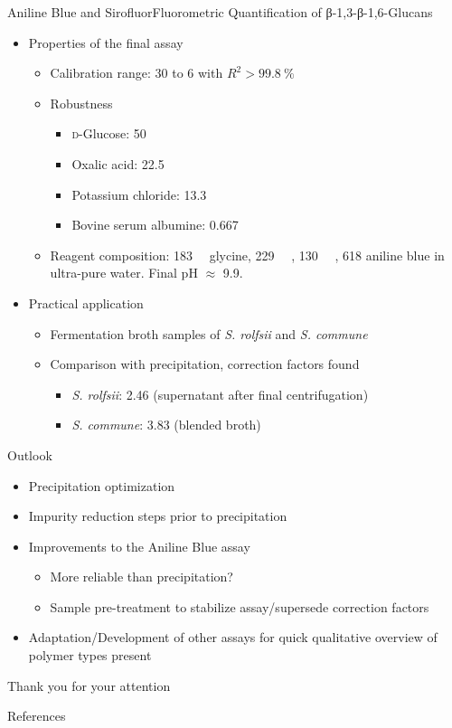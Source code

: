 \documentclass[mathserif]{beamer}
\newcommand{\SIpct}[1]{\SI{#1}{\percent}} %
\newcommand{\SImM}[1]{\SI{#1}{\milli\M}} %
\newcommand{\SIgpl}[1]{\SI{#1}{\gpl}} %
\newcommand{\SImgpl}[1]{\SI{#1}{\mgpl}} %
\newcommand{\mo}[1]{\emph{#1}} %
\newcommand{\rolf}{\mo{S. rolfsii}}
\newcommand{\comm}{\mo{S. commune}}
\newcommand{\GLC}{\textsc{d}-Glu\-cose}
\begin{document}
\begin{frame}{Aniline Blue and Sirofluor}{Fluorometric Quantification of β-1,3-β-1,6-Glucans \cite{Koenig2017}}
	\begin{itemize}
		\item Properties of the final assay
			\begin{itemize}
				\item Calibration range: \SImgpl{30} to \SIgpl{6} with $R^2 > \SIpct{99.8}$
				\pause
				\item Robustness
					\begin{itemize}
						\item \GLC{}: \SIgpl{50}
						\item Oxalic acid: \SIgpl{22.5}
						\item Potassium chloride: \SIgpl{13.3}
						\item Bovine serum albumine: \SIgpl{0.667}
					\end{itemize}
				\pause
				\item Reagent composition: \SImM{183} glycine, \SImM{229} , \SImM{130} , \SImgpl{618} aniline blue in ultra-pure water. Final pH $\approx$ 9.9.
			\end{itemize}
		\pause
		\item Practical application
			\begin{itemize}
				\item Fermentation broth samples of \rolf{} and \comm{}
				\pause
				\item Comparison with precipitation, correction factors found
				\pause
					\begin{itemize}
						\item \rolf{}: 2.46 (supernatant after final centrifugation)
						\item \comm{}: 3.83 (blended broth)
					\end{itemize}
			\end{itemize}
	\end{itemize}
\end{frame}

\begin{frame}{Outlook}{}
	\begin{itemize}
		\item Precipitation optimization
		\pause
		\item Impurity reduction steps prior to precipitation
		\pause
		\item Improvements to the Aniline Blue assay
		\begin{itemize}
			\item More reliable than precipitation?
			\pause
			\item Sample pre-treatment to stabilize assay/supersede correction factors
		\end{itemize}
		\pause
		\item Adaptation/Development of other assays for quick qualitative overview of polymer types present
	\end{itemize}
\end{frame}

\begin{frame}{Thank you for your attention}{}

\end{frame}

\begin{frame}[allowframebreaks]{References}{}
	\printbibliography
\end{frame}
\end{document}

